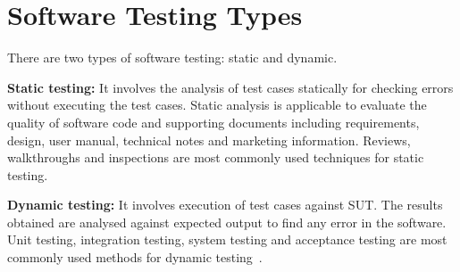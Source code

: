 




\section{Software Testing Types}
There are two types of software testing: static and dynamic.

\textbf{Static testing:} It involves the analysis of test cases statically for checking errors without executing the test cases. Static analysis is applicable to evaluate the quality of software code and supporting documents including requirements, design, user manual, technical notes and marketing information. Reviews, walkthroughs and inspections are most commonly used techniques for static testing.

\textbf{Dynamic testing:} It involves execution of test cases against SUT. The results obtained are analysed against expected output to find any error in the software. Unit testing, integration testing, system testing and acceptance testing are most commonly used methods for dynamic testing~\cite{fairley1978tutorial}.

